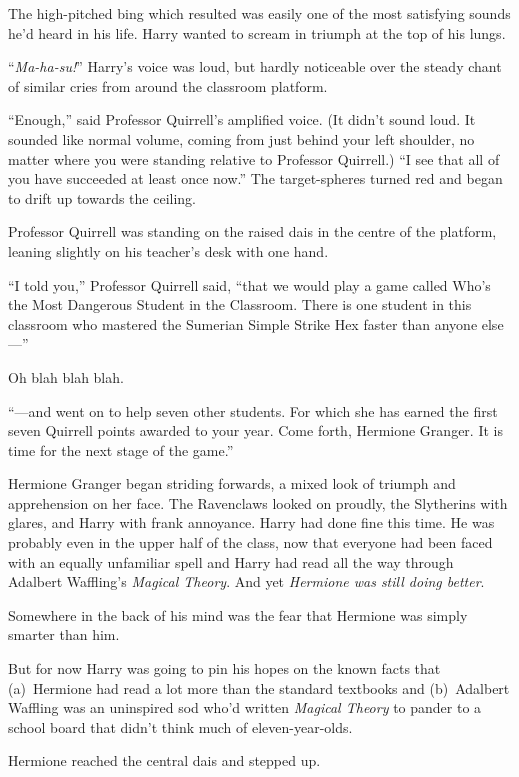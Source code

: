 The high-pitched bing which resulted was easily one of the most satisfying sounds he’d heard in his life. Harry wanted to scream in triumph at the top of his lungs. \emph{}

“\emph{Ma-ha-su!}” Harry’s voice was loud, but hardly noticeable over the steady chant of similar cries from around the classroom platform.

“Enough,” said Professor Quirrell’s amplified voice. (It didn’t sound loud. It sounded like normal volume, coming from just behind your left shoulder, no matter where you were standing relative to Professor Quirrell.) “I see that all of you have succeeded at least once now.” The target-spheres turned red and began to drift up towards the ceiling.

Professor Quirrell was standing on the raised dais in the centre of the platform, leaning slightly on his teacher’s desk with one hand.

“I told you,” Professor Quirrell said, “that we would play a game called Who’s the Most Dangerous Student in the Classroom. There is one student in this classroom who mastered the Sumerian Simple Strike Hex faster than anyone else—”

Oh blah blah blah.

“—and went on to help seven other students. For which she has earned the first seven Quirrell points awarded to your year. Come forth, Hermione Granger. It is time for the next stage of the game.”

Hermione Granger began striding forwards, a mixed look of triumph and apprehension on her face. The Ravenclaws looked on proudly, the Slytherins with glares, and Harry with frank annoyance. Harry had done fine this time. He was probably even in the upper half of the class, now that everyone had been faced with an equally unfamiliar spell and Harry had read all the way through Adalbert Waffling’s \emph{Magical Theory}. And yet \emph{Hermione was still doing better}.

Somewhere in the back of his mind was the fear that Hermione was simply smarter than him.

But for now Harry was going to pin his hopes on the known facts that (a)~Hermione had read a lot more than the standard textbooks and (b)~Adalbert Waffling was an uninspired sod who’d written \emph{Magical Theory} to pander to a school board that didn’t think much of eleven-year-olds.

Hermione reached the central dais and stepped up.

